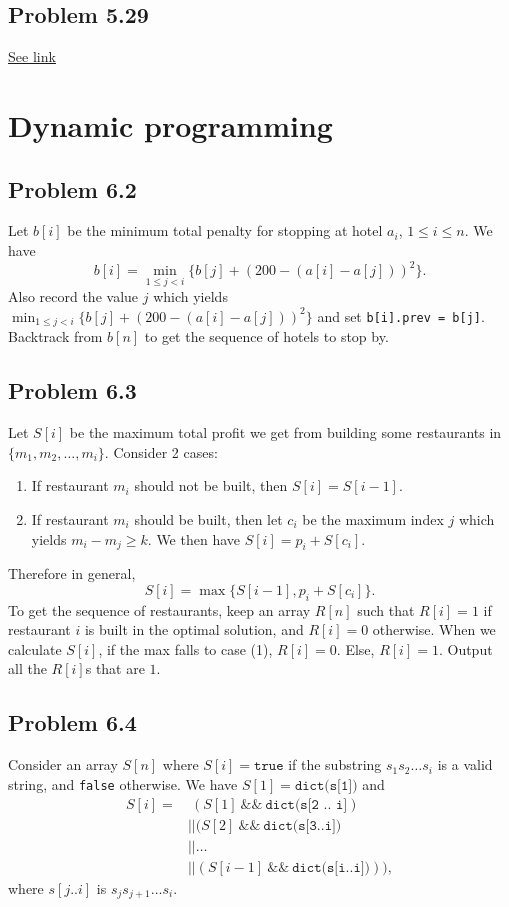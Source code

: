 \documentclass[12pt]{report}
\newcommand{\co}{\texttt}
\renewcommand{\and}{\ \&\& \ }
\begin{document}
\section{Problem 5.29}
\href{www.ece.northwestern.edu/~dda902/336/hw5-sol.pdf}{\underline{See link}}

\chapter[Chapter 6 Solution]{Dynamic programming}
\section{Problem 6.2}
Let $b[i]$ be the minimum total penalty for stopping at hotel $a_i$, $1 \le i \le n$. We have $$b[i] = \min_{1 \le j < i} \{ b[j] + (200 - (a[i] - a[j]))^2\}.$$
Also record the value $j$ which yields $\displaystyle \min_{1 \le j < i} \{ b[j] + (200 - (a[i] - a[j]))^2\}$ and set \co{b[i].prev = b[j]}. Backtrack from $b[n]$ to get the sequence of hotels to stop by.


\section{Problem 6.3}
Let $S[i]$ be the maximum total profit we get from building some restaurants in $\{m_1, m_2, \ldots, m_i\}$. Consider 2 cases:
\begin{enumerate}[(1)]
  \item If restaurant $m_i$ should not be built, then $S[i] = S[i-1]$.
  \item If restaurant $m_i$ should be built, then let $c_i$ be the maximum index $j$ which yields $m_i - m_j \ge k$. We then have $\displaystyle S[i] = p_i + S[c_i]$.
\end{enumerate}
Therefore in general, $$S[i] = \max \{ S[i-1], p_i + S[c_i]\}.$$
To get the sequence of restaurants, keep an array $R[n]$ such that $R[i] = 1$ if restaurant $i$ is built in the optimal solution, and $R[i] = 0$ otherwise. When we calculate $S[i]$, if the max falls to case (1), $R[i] = 0$. Else, $R[i] = 1$. Output all the $R[i]$s that are $1$.

\section{Problem 6.4}
Consider an array $S[n]$ where $S[i] = \co{true}$ if the substring $s_1 s_2 \ldots s_i$ is a valid string, and \co{false} otherwise. We have $S[1] = \co{dict(s[1])}$ and 
$$
\begin{aligned}
S[i] = & \ (S[1] \and \co{dict(s[2 .. i]}) \\ 
& || (S[2] \and \co{dict(s[3..i])} \\ 
& || \ldots \\
& || (S[i-1] \and \co{dict(s[i..i])})), 
\end{aligned}$$
where $s[j..i]$ is $s_j s_{j+1} \ldots s_i$.
\end{document}
